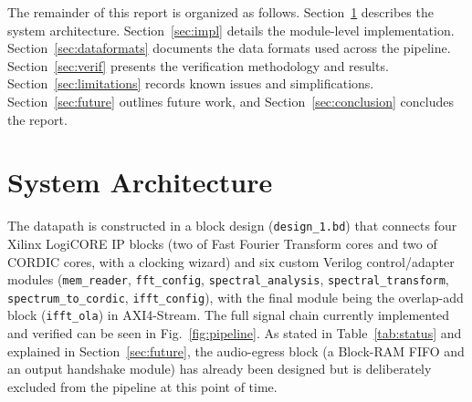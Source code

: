 \documentclass[conference,a4paper]{IEEEtran}
\begin{document}
The remainder of this report is organized as follows. Section~\ref{sec:arch} describes the
system architecture. Section~\ref{sec:impl} details the module-level implementation.
Section~\ref{sec:dataformats} documents the data formats used across the pipeline.
Section~\ref{sec:verif} presents the verification methodology and results.
Section~\ref{sec:limitations} records known issues and simplifications.
Section~\ref{sec:future} outlines future work, and Section~\ref{sec:conclusion} concludes
the report.

\section{System Architecture}
\label{sec:arch}
The datapath is constructed in a block design (\texttt{design\_1.bd})
that connects four Xilinx LogiCORE IP blocks (two of Fast Fourier Transform cores and two of
CORDIC cores, with a clocking wizard) and six custom Verilog control/adapter modules
(\texttt{mem\_reader}, \texttt{fft\_config}, \texttt{spectral\_analysis},
\texttt{spectral\_transform}, \texttt{spectrum\_to\_cordic}, \texttt{ifft\_config}),
with the final module being the overlap-add block (\texttt{ifft\_ola}) in AXI4-Stream.
The full signal chain currently implemented and verified can be seen in Fig.~\ref{fig:pipeline}.
As stated in Table~\ref{tab:status} and explained in Section~\ref{sec:future},
the audio-egress block (a Block-RAM FIFO and an output handshake module) has already been
designed but is deliberately excluded from the pipeline at this point of time.
\end{document}
